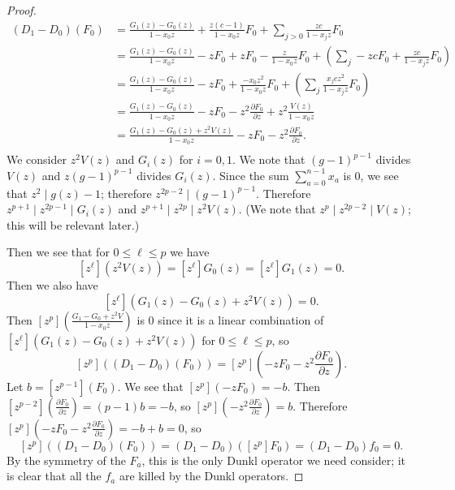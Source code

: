 \documentclass{amsart}
\numberwithin{equation}{section}
\theoremstyle{definition}
\begin{document}
\begin{proof}
\begin{align*}
(D_1-D_0)(F_0)&=\frac{G_1(z)-G_0(z)}{1-x_0z}+\frac{z(c-1)}{1-x_0z}F_0+\sum_{j>0} \frac{zc}{1-x_jz}F_0\\
&=\frac{G_1(z)-G_0(z)}{1-x_0z}-zF_0+zF_0-\frac{z}{1-x_0z}F_0+\left(\sum_{j} -zcF_0+\frac{zc}{1-x_jz}F_0\right)\\
&=\frac{G_1(z)-G_0(z)}{1-x_0z}-zF_0+\frac{-x_0z^2}{1-x_0z}F_0+\left(\sum_{j} \frac{x_jcz^2}{1-x_jz}F_0\right)\\
&=\frac{G_1(z)-G_0(z)}{1-x_0z}-zF_0-z^2\frac{\partial F_0}{\partial z}+z^2\frac{V(z)}{1-x_0z}\\
&=\frac{G_1(z)-G_0(z)+z^2V(z)}{1-x_0z}-zF_0-z^2\frac{\partial F_0}{\partial z}.\\
\end{align*}
We consider $z^2V(z)$ and $G_i(z)$ for $i=0,1$. We note that $(g-1)^{p-1}$ divides $V(z)$ and $z(g-1)^{p-1}$ divides $G_i(z)$. Since the sum $\sum_{a=0}^{n-1} x_a$ is $0$, we see that $z^2 \mid g(z)-1$; therefore $z^{2p-2} \mid (g-1)^{p-1}$. Therefore $z^{p+1} \mid z^{2p-1} \mid G_i(z)$ and $z^{p+1} \mid z^{2p} \mid z^2V(z)$. (We note that $z^p \mid z^{2p-2} \mid V(z)$; this will be relevant later.)

Then we see that for $0 \le \ell \le p$ we have
\[
[z^\ell](z^2V(z))=[z^\ell]G_0(z)=[z^\ell]G_1(z)=0.
\]
Then we also have
\[
[z^\ell](G_1(z)-G_0(z)+z^2V(z))=0.
\]
Then $[z^p]\left(\frac{G_1-G_0+z^2V}{1-x_0z}\right)$ is $0$ since it is a linear combination of $[z^\ell](G_1(z)-G_0(z)+z^2V(z))$ for $0 \le \ell \le p$, so 
\[
[z^p]\left((D_1-D_0)(F_0)\right)=[z^p]\left(-zF_0-z^2\frac{\partial F_0}{\partial z}\right).
\]
Let $b=[z^{p-1}](F_0)$. We see that $[z^p](-zF_0)=-b$. Then $[z^{p-2}]\left(\frac{\partial F_0}{\partial z}\right)=(p-1)b=-b$, so $[z^p]\left(-z^2\frac{\partial F_0}{\partial z}\right)=b$. Therefore $[z^p]\left(-zF_0-z^2\frac{\partial F_0}{\partial z}\right)=-b+b=0$, so 
\[
[z^p]((D_1-D_0)(F_0))=(D_1-D_0)([z^p]F_0)=(D_1-D_0)f_0=0.
\]
By the symmetry of the $F_a$, this is the only Dunkl operator we need consider; it is clear that all the $f_a$ are killed by the Dunkl operators.
\end{proof}
\end{document}
